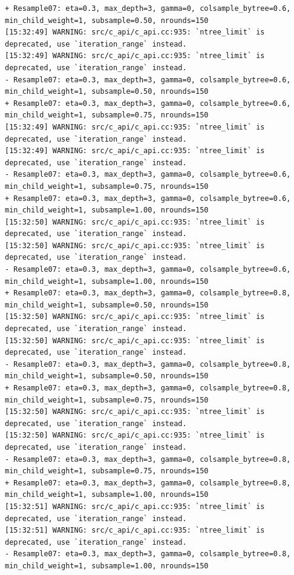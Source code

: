 \documentclass[
  letterpaper,
  DIV=11,
  numbers=noendperiod]{scrartcl}
\begin{document}
\begin{verbatim}
+ Resample07: eta=0.3, max_depth=3, gamma=0, colsample_bytree=0.6, min_child_weight=1, subsample=0.50, nrounds=150 
[15:32:49] WARNING: src/c_api/c_api.cc:935: `ntree_limit` is deprecated, use `iteration_range` instead.
[15:32:49] WARNING: src/c_api/c_api.cc:935: `ntree_limit` is deprecated, use `iteration_range` instead.
- Resample07: eta=0.3, max_depth=3, gamma=0, colsample_bytree=0.6, min_child_weight=1, subsample=0.50, nrounds=150 
+ Resample07: eta=0.3, max_depth=3, gamma=0, colsample_bytree=0.6, min_child_weight=1, subsample=0.75, nrounds=150 
[15:32:49] WARNING: src/c_api/c_api.cc:935: `ntree_limit` is deprecated, use `iteration_range` instead.
[15:32:49] WARNING: src/c_api/c_api.cc:935: `ntree_limit` is deprecated, use `iteration_range` instead.
- Resample07: eta=0.3, max_depth=3, gamma=0, colsample_bytree=0.6, min_child_weight=1, subsample=0.75, nrounds=150 
+ Resample07: eta=0.3, max_depth=3, gamma=0, colsample_bytree=0.6, min_child_weight=1, subsample=1.00, nrounds=150 
[15:32:50] WARNING: src/c_api/c_api.cc:935: `ntree_limit` is deprecated, use `iteration_range` instead.
[15:32:50] WARNING: src/c_api/c_api.cc:935: `ntree_limit` is deprecated, use `iteration_range` instead.
- Resample07: eta=0.3, max_depth=3, gamma=0, colsample_bytree=0.6, min_child_weight=1, subsample=1.00, nrounds=150 
+ Resample07: eta=0.3, max_depth=3, gamma=0, colsample_bytree=0.8, min_child_weight=1, subsample=0.50, nrounds=150 
[15:32:50] WARNING: src/c_api/c_api.cc:935: `ntree_limit` is deprecated, use `iteration_range` instead.
[15:32:50] WARNING: src/c_api/c_api.cc:935: `ntree_limit` is deprecated, use `iteration_range` instead.
- Resample07: eta=0.3, max_depth=3, gamma=0, colsample_bytree=0.8, min_child_weight=1, subsample=0.50, nrounds=150 
+ Resample07: eta=0.3, max_depth=3, gamma=0, colsample_bytree=0.8, min_child_weight=1, subsample=0.75, nrounds=150 
[15:32:50] WARNING: src/c_api/c_api.cc:935: `ntree_limit` is deprecated, use `iteration_range` instead.
[15:32:50] WARNING: src/c_api/c_api.cc:935: `ntree_limit` is deprecated, use `iteration_range` instead.
- Resample07: eta=0.3, max_depth=3, gamma=0, colsample_bytree=0.8, min_child_weight=1, subsample=0.75, nrounds=150 
+ Resample07: eta=0.3, max_depth=3, gamma=0, colsample_bytree=0.8, min_child_weight=1, subsample=1.00, nrounds=150 
[15:32:51] WARNING: src/c_api/c_api.cc:935: `ntree_limit` is deprecated, use `iteration_range` instead.
[15:32:51] WARNING: src/c_api/c_api.cc:935: `ntree_limit` is deprecated, use `iteration_range` instead.
- Resample07: eta=0.3, max_depth=3, gamma=0, colsample_bytree=0.8, min_child_weight=1, subsample=1.00, nrounds=150 

\end{verbatim}
\end{document}

